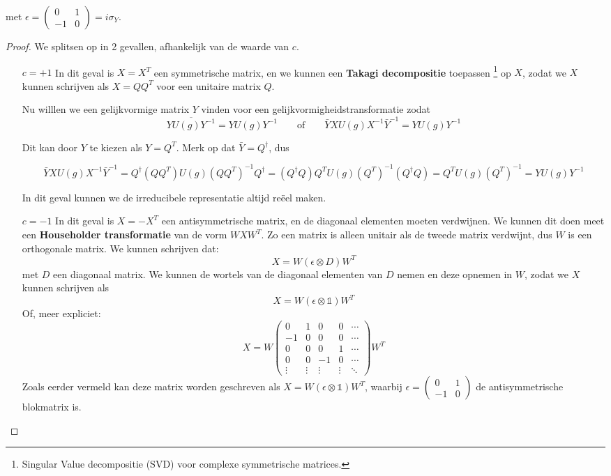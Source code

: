 met \(\epsilon = \begin{pmatrix} 0 & 1 \\ -1 & 0 \end{pmatrix} = i \sigma_Y\).
\begin{proof}
    We splitsen op in 2 gevallen, afhankelijk van de waarde van \(c\).
\begin{itemize}
    \item[\(c=+1\)]
    In dit geval is \(X = X^T\) een symmetrische matrix,
    en we kunnen een \textbf{Takagi decompositie} toepassen \footnote{Singular Value decompositie (SVD) voor complexe symmetrische matrices.}
    op \(X\), zodat we \(X\) kunnen schrijven als \(X = QQ^T\) voor een unitaire matrix \(Q\).

    Nu willlen we een gelijkvormige matrix \(Y\) vinden voor een gelijkvormigheidstransformatie zodat
    \[\overline{YU(g)Y^{-1}} = Y U(g) Y^{-1} \qquad \text{of} \qquad \bar{Y}XU(g)X^{-1}\bar{Y}^{-1} = YU(g)Y^{-1}\]

    Dit kan door \(Y\) te kiezen als \(\boxed{Y = Q^{T}}\). Merk op dat \(\bar{Y}=Q^{\dagger}\), dus

    \[\bar{Y}XU(g)X^{-1}\bar{Y}^{-1} = Q^{\dagger}(QQ^{T})U(g)(QQ^{T})^{-1}Q^{\dagger}
    = (Q^{\dagger}Q)Q^{T}U(g)(Q^{T})^{-1}(Q^{\dagger}Q) = Q^{T}U(g)(Q^{T})^{-1} = YU(g)Y^{-1}\]

    In dit geval kunnen we de irreducibele representatie altijd reëel maken.

    \item[\(c=-1\)]
    In dit geval is \(X = -X^T\) een antisymmetrische matrix, en de diagonaal elementen moeten verdwijnen.
    We kunnen dit doen meet een \textbf{Householder transformatie} van de vorm \(WXW^T\).
    Zo een matrix is alleen unitair als de tweede matrix verdwijnt, dus \(W\) is een orthogonale matrix.
    We kunnen schrijven dat:
    \[ X = W (\epsilon \otimes D)W^T \]
    met \(D\) een diagonaal matrix.  We kunnen de wortels van de diagonaal elementen van \(D\) nemen en deze opnemen in \(W\), zodat we \(X\) kunnen schrijven als
    \[X = W(\epsilon \otimes \mathds{1})W^T\]
    Of, meer expliciet:
    \[X = W \begin{pmatrix}
            0 & 1 & 0 & 0 & \cdots \\
            -1 & 0 & 0 & 0 & \cdots \\
            0 & 0 & 0 & 1 & \cdots \\
            0 & 0 & -1 & 0 & \cdots \\
            \vdots & \vdots & \vdots & \vdots & \ddots
            \end{pmatrix} W^T\]
    Zoals eerder vermeld kan deze matrix worden geschreven als \(X = W (\epsilon \otimes \mathds{1}) W^T\), waarbij \(\epsilon = \begin{pmatrix} 0 & 1 \\ -1 & 0 \end{pmatrix}\) de antisymmetrische blokmatrix is.


\end{itemize}
\end{proof}
